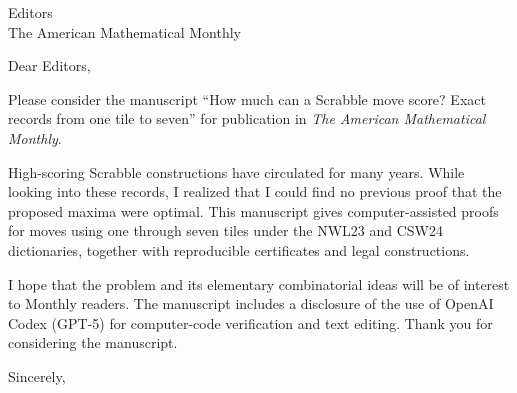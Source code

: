 \documentclass[11pt]{letter}
\date{14 September 2026}
\begin{document}
\begin{letter}{Editors\\The American Mathematical Monthly}
\opening{Dear Editors,}

Please consider the manuscript ``How much can a Scrabble move score? Exact
records from one tile to seven'' for publication in \textit{The American
Mathematical Monthly}.

High-scoring Scrabble constructions have circulated for many years. While
looking into these records, I realized that I could find no previous proof that
the proposed maxima were optimal. This manuscript gives computer-assisted
proofs for moves using one through seven tiles under the NWL23 and CSW24
dictionaries, together with reproducible certificates and legal constructions.

I hope that the problem and its elementary combinatorial ideas will be of
interest to Monthly readers. The manuscript includes a disclosure of the use of
OpenAI Codex (GPT-5) for computer-code verification and text editing. Thank you
for considering the manuscript.

\closing{Sincerely,}
\end{letter}
\end{document}
